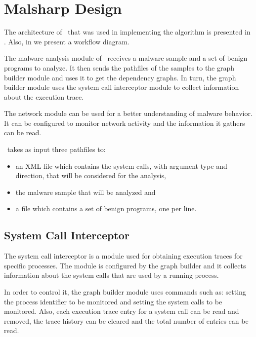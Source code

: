 
\section{Malsharp Design}
\label{third:design}

The architecture of \project\ that was used in implementing the algorithm is presented in . Also, in  we present a workflow diagram.

The malware analysis module of \project\ receives a malware sample and a set of benign programs to analyze. It then sends the pathfiles of the samples to the graph builder module and uses it to get the dependency graphs. In turn, the graph builder module uses the system call interceptor module to collect information about the execution trace.

The network module can be used for a better understanding of malware behavior. It can be configured to monitor network activity and the information it gathers can be read.


\project\ takes as input three pathfiles to: 
\begin{itemize}
	\item an XML file which contains the system calls, with argument type and direction, that will be considered for the analysis,
	\item the malware sample that will be analyzed and
	\item a file which contains a set of benign programs, one per line.
\end{itemize}

\subsection{System Call Interceptor}

The system call interceptor is a module used for obtaining execution traces for specific processes. The module is configured by the graph builder and it collects information about the system calls that are used by a running process.

In order to control it, the graph builder module uses commands such as: setting the process identifier to be monitored and setting the system calls to be monitored. Also, each execution trace entry for a system call can be read and removed, the trace history can be cleared and the total number of entries can be read.

